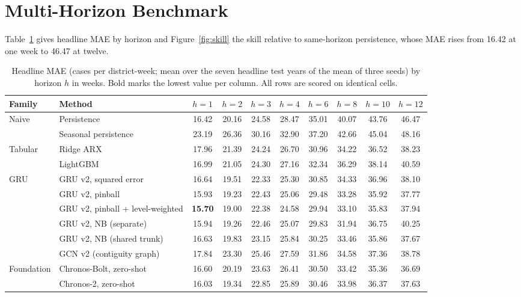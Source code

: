 \section{Multi-Horizon Benchmark}
\label{sec:benchmark}

Table~\ref{tab:main} gives headline MAE by horizon and Figure~\ref{fig:skill} the skill relative to same-horizon persistence, whose MAE rises from 16.42 at one week to 46.47 at twelve.

\begin{table}[t]
\centering
\caption{Headline MAE (cases per district-week; mean over the seven headline test years of the mean of three seeds) by horizon $h$ in weeks. Bold marks the lowest value per column. All rows are scored on identical cells.}
\label{tab:main}
\begin{tabular}{llcccccccc}
\toprule
\textbf{Family} & \textbf{Method} & $h=1$ & $h=2$ & $h=3$ & $h=4$ & $h=6$ & $h=8$ & $h=10$ & $h=12$ \\
\midrule
Naive & Persistence & 16.42 & 20.16 & 24.58 & 28.47 & 35.01 & 40.07 & 43.76 & 46.47 \\
 & Seasonal persistence & 23.19 & 26.36 & 30.16 & 32.90 & 37.20 & 42.66 & 45.04 & 48.16 \\
Tabular & Ridge ARX & 17.96 & 21.39 & 24.24 & 26.70 & 30.96 & 34.22 & 36.52 & 38.23 \\
 & LightGBM & 16.99 & 21.05 & 24.30 & 27.16 & 32.34 & 36.29 & 38.14 & 40.59 \\
GRU & GRU v2, squared error & 16.64 & 19.51 & 22.33 & 25.30 & 30.85 & 34.33 & 36.96 & 38.10 \\
 & GRU v2, pinball & 15.93 & 19.23 & 22.43 & 25.06 & 29.48 & 33.28 & 35.92 & 37.77 \\
 & GRU v2, pinball + level-weighted & \textbf{15.70} & 19.00 & 22.38 & 24.58 & 29.94 & 33.10 & 35.83 & 37.94 \\
 & GRU v2, NB (separate) & 15.94 & 19.26 & 22.46 & 25.07 & 29.83 & 31.94 & 36.75 & 40.25 \\
 & GRU v2, NB (shared trunk) & 16.63 & 19.83 & 23.15 & 25.84 & 30.25 & 33.46 & 35.86 & 37.67 \\
 & GCN v2 (contiguity graph) & 17.84 & 23.30 & 25.46 & 27.59 & 31.86 & 34.58 & 37.36 & 38.78 \\
Foundation & Chronos-Bolt, zero-shot & 16.60 & 20.19 & 23.63 & 26.41 & 30.50 & 33.42 & 35.36 & 36.69 \\
 & Chronos-2, zero-shot & 16.03 & 19.34 & 22.85 & 25.89 & 30.46 & 33.98 & 36.37 & 37.63 \\

\end{tabular}
\end{table}
